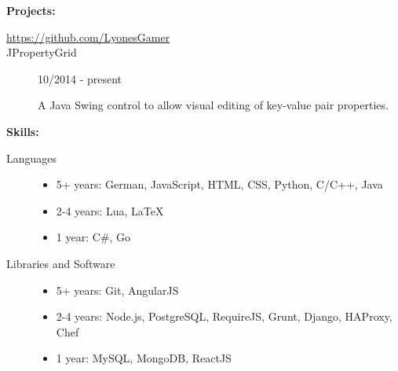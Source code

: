 \documentclass[11pt]{article}
\begin{document}
\smallskip
{\huge \textbf{Projects:}}
\hrulefill
\smallskip
\begin{description}
\item[\url{https://github.com/LyonesGamer}]
\smallskip
\item[JPropertyGrid]
\hfill 10/2014 - present

A Java Swing control to allow visual editing of key-value pair properties.
\end{description}
\bigskip
{\huge \textbf{Skills:}}
\hrulefill
\smallskip
\begin{description}
\item[Languages]
\hfill
\begin{itemize}
\item 5+ years: German, JavaScript, HTML, CSS, Python, C/C++, Java
\item 2-4 years: Lua, LaTeX
\item 1 year: C\#, Go
\end{itemize}
\item[Libraries and Software]
\hfill
\begin{itemize}
\item 5+ years: Git, AngularJS
\item 2-4 years: Node.js, PostgreSQL, RequireJS, Grunt, Django, HAProxy, Chef
\item 1 year: MySQL, MongoDB, ReactJS
\end{itemize}
\end{description}
\end{document}
